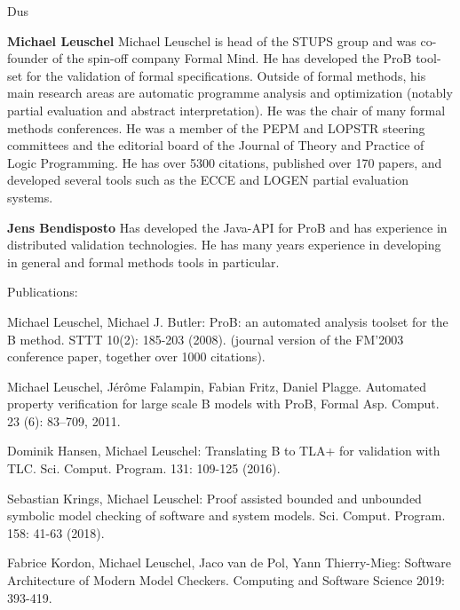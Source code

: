 \begin{sitedescription}{Dus}
\begin{compactitem}
\item
\textbf{Michael Leuschel}
Michael Leuschel is head of the STUPS group and was co-founder of the spin-off
company Formal Mind.
He has developed the ProB tool-set for the validation of formal specifications.
Outside of formal methods, his main research areas are automatic programme analysis and optimization (notably partial evaluation and abstract interpretation).
He was the chair of many formal methods conferences.
He was a member of the PEPM and LOPSTR steering committees and
 the editorial board of the Journal of Theory and Practice of Logic Programming.
He has over 5300 citations, published over 170 papers, 
and developed several tools such as the ECCE and LOGEN partial evaluation systems.

\item
\textbf{Jens Bendisposto}
Has developed the Java-API for ProB and has experience in distributed validation technologies.
He has many years experience in developing in general and formal methods tools in particular.
\end{compactitem}


Publications:
\begin{compactitem}
\item Michael Leuschel, Michael J. Butler: ProB: an automated analysis toolset for the B method. STTT 10(2): 185-203 (2008).
 (journal version of the FM'2003 conference paper, together over 1000 citations).
\item Michael Leuschel, J{\'e}r{\^o}me Falampin, Fabian Fritz, Daniel Plagge.
Automated property verification for large scale {B} models with {ProB},
Formal Asp. Comput. 23 (6): 83--709, 2011.
\item Dominik Hansen, Michael Leuschel: Translating B to TLA+ for validation with TLC. Sci. Comput. Program. 131: 109-125 (2016).
\item Sebastian Krings, Michael Leuschel:
Proof assisted bounded and unbounded symbolic model checking of software and system models. Sci. Comput. Program. 158: 41-63 (2018).
\item Fabrice Kordon, Michael Leuschel, Jaco van de Pol, Yann Thierry-Mieg:
Software Architecture of Modern Model Checkers. Computing and Software Science 2019: 393-419.
\end{compactitem}


\end{sitedescription}

